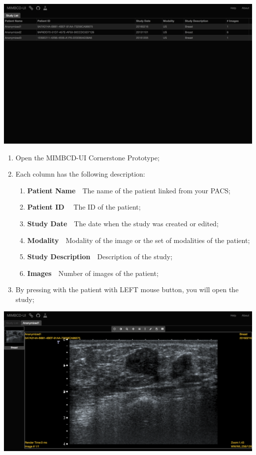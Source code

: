 \documentclass{tufte-book} %
\begin{document}
\hfill

\begin{center}
\includegraphics[width=\textwidth]{graphics/study_list_base.png}
\end{center}

\hfill

\clearpage

\hfill

\begin{enumerate}
\item Open the MIMBCD-UI Cornerstone Prototype;
\item Each column has the following description:
\begin{enumerate}
\item \textbf{Patient Name}~\textendash~The name of the patient linked from your PACS;
\item \textbf{Patient ID}~\textendash~ The ID of the patient;
\item \textbf{Study Date}~\textendash~The date when the study was created or edited;
\item \textbf{Modality}~\textendash~Modality of the image or the set of modalities of the patient;
\item \textbf{Study Description}~\textendash~Description of the study;
\item \textbf{Images}~\textendash~Number of images of the patient;
\end{enumerate}
\item By pressing with the patient with LEFT mouse button, you will open the study;
\end{enumerate}

\hfill

\begin{center}
\includegraphics[width=\textwidth]{graphics/anon1_open.png}
\end{center}
\end{document}
